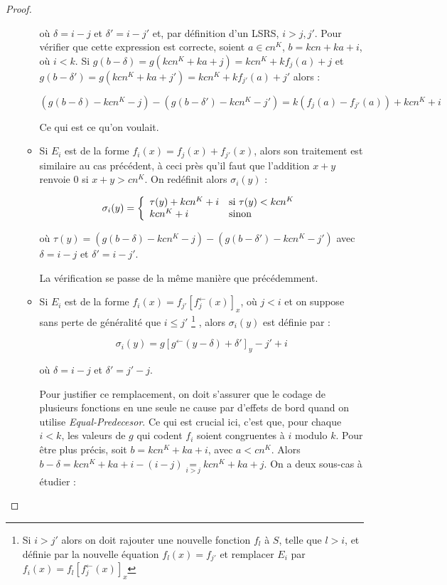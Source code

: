 \documentclass{article}
\newcommand{\eqpred}[3]{#1\left[ #2^{\leftarrow}(#3) \right]_{#3}}
\newcommand{\eqpredfi}[5]{#1\left[ #2^{\leftarrow}(#3) #4 \right]_{#5}} %
\begin{document}
\begin{proof}
\begin{enumerate}[itemsep=-1mm,leftmargin=2cm]
\begin{itemize}[itemsep=-1mm, leftmargin=1cm]
							où $\delta = i -j$ et $\delta' = i - j'$ et, par définition d'un LSRS, $i > j, j'$. Pour vérifier que cette expression est correcte, soient $a \in cn^K$, $b = kcn + ka + i$, où $i<k$. Si $g(b - \delta) = g(kcn^K + ka + j) = kcn^K + kf_j(a) + j$ et $g(b - \delta') = g(kcn^K + ka + j') = kcn^K + kf_{j'}(a) + j'$ alors :
							
							\[
								\left( g\left( b - \delta \right) - kcn^K - j \right) - \left( g\left( b - \delta' \right) - kcn^K - j' \right)
								=  k \left( f_{j}(a) - f_{j'}(a) \right) + kcn^K + i
							\]

							
							Ce qui est ce qu'on voulait.
							
						\item
							Si $E_i$ est de la forme $f_i(x) = f_j(x) + f_{j'}(x)$, alors son traitement est similaire au cas précédent, à ceci près qu'il faut que l'addition $x + y$ renvoie $0$ si $x + y > cn^K$. On redéfinit alors $\sigma_i(y)$ : 
							
							\[
								\sigma_i(y) = \left\lbrace \begin{array}{ll} 
									\tau(y) + kcn^K + i & \text{si $\tau(y) < kcn^K$} \\
									kcn^K + i & \text{sinon}
									 \end{array} \right.
							\]
							
							où $\tau(y) = \left( g\left( b - \delta \right) - kcn^K - j \right) - \left( g\left( b - \delta' \right) - kcn^K - j' \right)$ avec $\delta = i - j$ et $\delta' = i - j'$. 
							
							La vérification se passe de la même manière que précédemment.
							
						\item
							Si $E_i$ est de la forme $f_i(x) = \eqpred{f_{j'}}{f_j}{x}$, où $j < i$ et on suppose sans perte de généralité que $i \leqslant j'$ 
								\footnote{Si $i > j'$ alors on doit rajouter une nouvelle fonction $f_l$ à $S$, telle que $l > i$, et définie par la nouvelle équation $f_l(x) = f_{j'}$ et remplacer $E_i$ par $f_i(x) = \eqpred{f_{l}}{f_j}{x}$}
							, alors $\sigma_i(y)$ est définie par :
							
							\[
								\sigma_i(y) = \eqpredfi{g}{g}{y-\delta}{ + \delta'}{y} - j' + i
							\]
							
							où $\delta = i - j$ et $\delta' = j' - j$.
							
							Pour justifier ce remplacement, on doit s'assurer que le codage de plusieurs fonctions en une seule ne cause par d'effets de bord quand on utilise \emph{Equal-Predecesor}. Ce qui est crucial ici, c'est que, pour chaque $i<k$, les valeurs de $g$ qui codent $f_i$ soient congruentes à $i$ modulo $k$. Pour être plus précis, soit $b = kcn^K + ka + i$, avec $a< cn^K$. Alors $b-\delta = kcn^K + ka + i - (i - j) \underset{i>j}{=} kcn^K + ka + j$. On a deux sous-cas à étudier :
							

\end{itemize}
\end{enumerate}
\end{proof}
\end{document}
